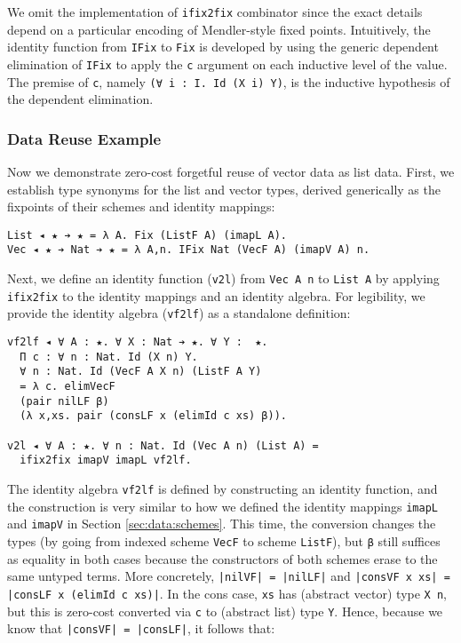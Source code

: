 \documentclass[acmsmall]{acmart}\settopmatter{}
\newcommand{\refsec}[1]{Section \ref{sec:#1}}
\begin{document}
We omit the implementation of \verb;ifix2fix; combinator since the
exact details depend on a particular encoding of Mendler-style fixed
points. Intuitively, the identity function from \verb;IFix; to
\verb;Fix; is developed by using the generic dependent elimination of
\verb;IFix; to apply the \verb;c; argument on each inductive level of
the value. The premise of \verb;c;, namely
\verb;(∀ i : I. Id (X i) Y);, is the inductive hypothesis of the
dependent elimination.

\subsubsection{Data Reuse Example}

Now we demonstrate zero-cost forgetful reuse of vector data as list
data. First, we establish type synonyms for the list and vector types,
derived generically as the fixpoints of their schemes and identity
mappings:

\begin{verbatim}
List ◂ ★ ➔ ★ = λ A. Fix (ListF A) (imapL A).
Vec ◂ ★ ➔ Nat ➔ ★ = λ A,n. IFix Nat (VecF A) (imapV A) n.
\end{verbatim}
Next, we define an identity function (\verb;v2l;) from
\verb;Vec A n; to \verb;List A; by applying
\verb;ifix2fix; to the identity mappings and an
identity algebra. For legibility, we provide the identity algebra
(\verb;vf2lf;) as a standalone definition:

\begin{verbatim}
vf2lf ◂ ∀ A : ★. ∀ X : Nat ➔ ★. ∀ Y :  ★. 
  Π c : ∀ n : Nat. Id (X n) Y.
  ∀ n : Nat. Id (VecF A X n) (ListF A Y)
  = λ c. elimVecF
  (pair nilLF β)
  (λ x,xs. pair (consLF x (elimId c xs) β)).

v2l ◂ ∀ A : ★. ∀ n : Nat. Id (Vec A n) (List A) =
  ifix2fix imapV imapL vf2lf. 
\end{verbatim}
The identity algebra \verb;vf2lf; is defined by constructing an
identity function, and the construction is very similar to how we
defined the identity mappings \verb;imapL; and \verb;imapV; in
\refsec{data:schemes}. This time, the conversion changes the types (by going
from indexed scheme \verb;VecF; to scheme \verb;ListF;), but \verb;β;
still suffices as equality in both cases because the constructors of
both schemes erase to the same untyped terms. More concretely,
\verb;|nilVF| = |nilLF|; and
\verb;|consVF x xs| = |consLF x (elimId c xs)|;. In the cons case,
\verb;xs; has (abstract vector) type \verb;X n;, but this is zero-cost
converted via \verb;c; to (abstract list) type \verb;Y;. Hence,
because we know that \verb;|consVF| = |consLF|;, it follows that:
\end{document}
